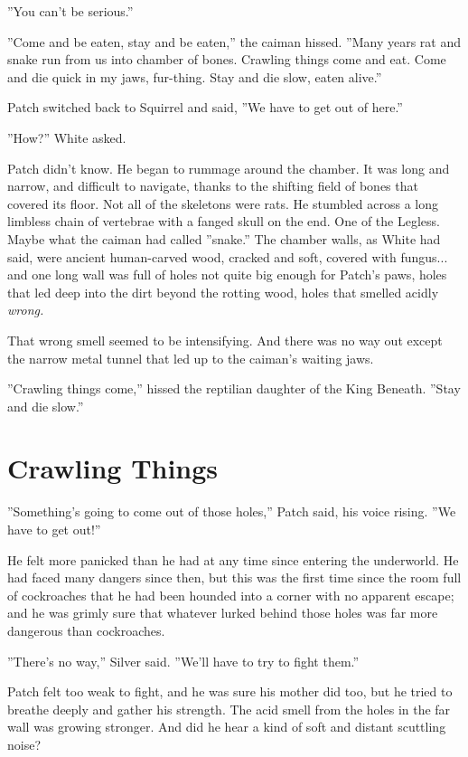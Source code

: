 \documentclass[12pt]{book}
\begin{document}
''You can't be serious.''

''Come and be eaten, stay and be eaten,'' the caiman hissed. ''Many years rat and snake run from us into chamber of bones. Crawling things come and eat. Come and die quick in my jaws, fur-thing. Stay and die slow, eaten alive.''

Patch switched back to Squirrel and said, ''We have to get out of here.''

''How?'' White asked.

Patch didn't know. He began to rummage around the chamber. It was long and narrow, and difficult to navigate, thanks to the shifting field of bones that covered its floor. Not all of the skeletons were rats. He stumbled across a long limbless chain of vertebrae with a fanged skull on the end. One of the Legless. Maybe what the caiman had called ''snake.'' The chamber walls, as White had said, were ancient human-carved wood, cracked and soft, covered with fungus... and one long wall was full of holes not quite big enough for Patch's paws, holes that led deep into the dirt beyond the rotting wood, holes that smelled acidly {\it wrong.} 

That wrong smell seemed to be intensifying. And there was no way out except the narrow metal tunnel that led up to the caiman's waiting jaws.

''Crawling things come,'' hissed the reptilian daughter of the King Beneath. ''Stay and die slow.''


\section{Crawling Things}

''Something's going to come out of those holes,'' Patch said, his voice rising. ''We have to get out!''

He felt more panicked than he had at any time since entering the underworld. He had faced many dangers since then, but this was the first time since the room full of cockroaches that he had been hounded into a corner with no apparent escape; and he was grimly sure that whatever lurked behind those holes was far more dangerous than cockroaches.

''There's no way,'' Silver said. ''We'll have to try to fight them.''

Patch felt too weak to fight, and he was sure his mother did too, but he tried to breathe deeply and gather his strength. The acid smell from the holes in the far wall was growing stronger. And did he hear a kind of soft and distant scuttling noise?
\end{document}
